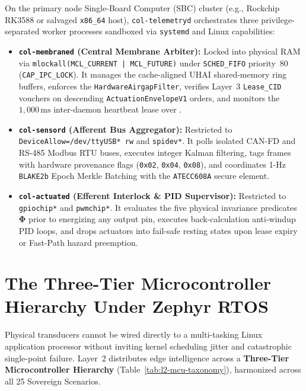 On the primary node Single-Board Computer (SBC) cluster (e.g., Rockchip RK3588 or salvaged \texttt{x86\_64} host), \texttt{col-telemetryd} orchestrates three privilege-separated worker processes sandboxed via \texttt{systemd} and Linux capabilities:
\begin{itemize}
    \item \textbf{\texttt{col-membraned} (Central Membrane Arbiter):} Locked into physical RAM via \texttt{mlockall(\allowbreak MCL\_CURRENT | MCL\_FUTURE)} under \texttt{SCHED\_FIFO} priority~80 (\texttt{CAP\_IPC\_LOCK}). It manages the cache-aligned UHAI shared-memory ring buffers, enforces the \texttt{HardwareAirgapFilter}, verifies Layer~3 \texttt{Lease\_CID} vouchers on descending \texttt{ActuationEnvelopeV1} orders, and monitors the $1{,}000\,\mathrm{ms}$ inter-daemon heartbeat lease over .
    \item \textbf{\texttt{col-sensord} (Afferent Bus Aggregator):} Restricted to \texttt{DeviceAllow=/dev/ttyUSB* rw} and \texttt{spidev*}. It polls isolated CAN-FD and RS-485 Modbus RTU buses, executes integer Kalman filtering, tags frames with hardware provenance flags (\texttt{0x02}, \texttt{0x04}, \texttt{0x08}), and coordinates 1-Hz \texttt{BLAKE2b} Epoch Merkle Batching with the \texttt{ATECC608A} secure element.
    \item \textbf{\texttt{col-actuated} (Efferent Interlock \& PID Supervisor):} Restricted to \texttt{gpiochip*} and \texttt{pwmchip*}. It evaluates the five physical invariance predicates $\mathbf{\Phi}$ prior to energizing any output pin, executes back-calculation anti-windup PID loops, and drops actuators into fail-safe resting states upon lease expiry or Fast-Path hazard preemption.
\end{itemize}

\section{The Three-Tier Microcontroller Hierarchy Under Zephyr RTOS}
\label{sec:l2-zephyr-mcu-hierarchy}

Physical transducers cannot be wired directly to a multi-tasking Linux application processor without inviting kernel scheduling jitter and catastrophic single-point failure. Layer~2 distributes edge intelligence across a \textbf{Three-Tier Microcontroller Hierarchy} (Table~\ref{tab:l2-mcu-taxonomy}), harmonized across all 25 Sovereign Scenarios.


